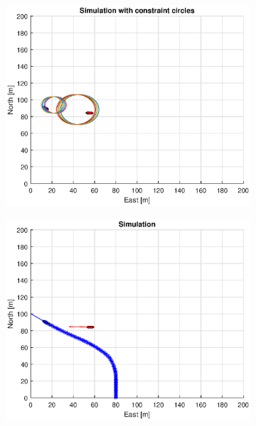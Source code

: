 \begin{figure}[ht]
\begin{subfigure}[b]{0.499\textwidth}
    \end{subfigure}
    \hfill
    \\
    \begin{subfigure}[b]{0.49\textwidth}
        \centering
        \includegraphics[width=\textwidth]{Images/Figures/sving_GW/Simple1_f1_Frame5}
    \end{subfigure}
    \hfill
    \begin{subfigure}[b]{0.499\textwidth}
        \centering
        \includegraphics[width=\textwidth]{Images/Figures/sving_GW/Simple1_f600_Frame5}

\end{subfigure}
\end{figure}
